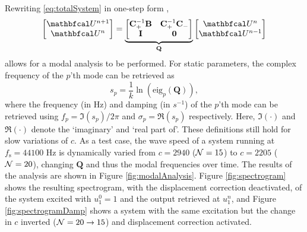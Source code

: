 Rewriting \eqref{eq:totalSystem} in one-step form \cite{bilbao2009}, 
\begin{equation}\label{eq:oneStepForm}
    \begin{bmatrix}
        \U^{n+1}\\
        \U^n
    \end{bmatrix} = 
    \underbrace{\begin{bmatrix}
        \mathbf{C}_+^{-1}\mathbf{B} & \mathbf{C}_+^{-1}\mathbf{C}_-\\
        \mathbf{I} & \mathbf{0}
    \end{bmatrix}}_{\mathbf{Q}}
    \begin{bmatrix}
        \U^n\\
        \U^{n-1}
    \end{bmatrix}
\end{equation}
allows for a modal analysis to be performed. For static parameters, the complex frequency of the $p$'th mode can be retrieved as
\begin{equation}\label{eq:modalAnalysis}
    s_p = \frac{1}{k}\ln \left(\text{eig}_p(\mathbf{Q})\right),
\end{equation}
where the frequency (in Hz) and damping (in $s^{-1}$) of the $p$'th mode can be retrieved using $f_p = \mathfrak{I}(s_p)/2\pi$ and $\sigma_p = \mathfrak{R}(s_p)$
respectively. Here, $\mathfrak{I}(\cdot)$ and $\mathfrak{R}(\cdot)$ denote the `imaginary' and `real part of'. These definitions still hold for slow variations of $c$. As a test case, the wave speed of a system running at $f_\text{s} = 44100$ Hz is dynamically varied from $c = 2940$ ($\mathcal{N} = 15$) to $c = 2205$ ($\mathcal{N} = 20$), changing $\mathbf{Q}$ and thus the modal frequencies over time. %
The results of the analysis are shown in Figure \ref{fig:modalAnalysis}. Figure \ref{fig:spectrogram} shows the resulting spectrogram, with the displacement correction deactivated, of the system excited with $u_1^0 = 1$ and the output retrieved at $u_1^n$, and Figure \ref{fig:spectrogramDamp} shows a system with the same excitation but the change in $c$ inverted ($\mathcal{N}=20\rightarrow 15$) and displacement correction activated.

